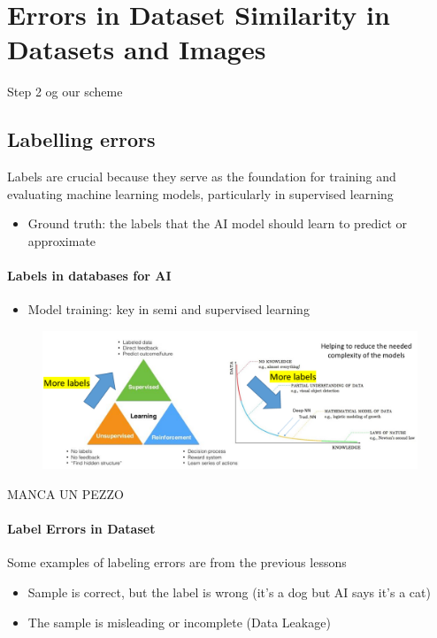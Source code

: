 \chapter{Errors in Dataset Similarity in Datasets and Images}
Step 2 og our scheme




\section{Labelling errors}
\noindent Labels are crucial because they serve as the foundation for training and evaluating machine learning models, particularly in supervised learning
\begin{itemize}
    \item Ground truth: the labels that the AI model should learn to predict or approximate
\end{itemize}

\subsubsection{Labels in databases for AI}
\begin{itemize}
    \item Model training: key in semi and supervised learning
\end{itemize}
\begin{figure}[H]
    \centering
    \includegraphics[width=0.8\linewidth]{09-10/images/labels.png}
\end{figure}

MANCA UN PEZZO

\subsubsection{Label Errors in Dataset}
\noindent Some examples of labeling errors are from the previous lessons
\begin{itemize}
    \item Sample is correct, but the label is wrong (it's a dog but AI says it's a cat)
    \item The sample is misleading or incomplete (Data Leakage)
\end{itemize}

